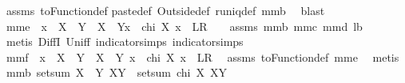 \begin{isabellebody}
\ assms\ toFunction{\isacharunderscore}def\isanewline
paste{\isacharunderscore}def\ Outside{\isacharunderscore}def\ runiq{\isacharunderscore}def\ mm{}{}b\ \isamarkupfalse%
\ blast%
\endisatagproof
{\isafoldproof}%
%
\isadelimproof
%
\endisadelimproof
\isanewline
\isanewline
{}\isamarkupfalse%
\ mm{}{}e{\isacharcolon}\ \ {\isachardoublequoteopen}x\ {\isasymin}\ X\ {\isasymunion}\ Y{\isachardoublequoteclose}\ \ {\isachardoublequoteopen}{\isacharparenleft}X\ {\isacharless}{\isacharbar}{\isacharbar}\ Y{\isacharparenright}{\isacharcomma}{\isacharcomma}x\ {\isacharequal}\ chi\ X\ x{\isachardoublequoteclose}\ {\isacharparenleft}\ {\isachardoublequoteopen}{\isacharquery}L{\isacharequal}{\isacharquery}R{\isachardoublequoteclose}{\isacharparenright}%
\isadelimproof
\ %
\endisadelimproof
%
\isatagproof
{}\isamarkupfalse%
\ \isanewline
assms\ mm{}{}b\ mm{}{}c\ mm{}{}d\ l{}{}b\ \isamarkupfalse%
\ {\isacharparenleft}metis\ DiffI\ Un{\isacharunderscore}iff\ indicator{\isacharunderscore}simps{\isacharparenleft}{}{\isacharparenright}\ indicator{\isacharunderscore}simps{\isacharparenleft}{}{\isacharparenright}{\isacharparenright}%
\endisatagproof
{\isafoldproof}%
%
\isadelimproof
%
\endisadelimproof
\isanewline
\isanewline
{}\isamarkupfalse%
\ mm{}{}f{\isacharcolon}\ \ {\isachardoublequoteopen}x\ {\isasymin}\ X\ {\isasymunion}\ Y{\isachardoublequoteclose}\ \ {\isachardoublequoteopen}{\isacharparenleft}X\ {\isacharless}{\isacharbar}\ Y{\isacharparenright}\ x\ {\isacharequal}\ chi\ X\ x{\isachardoublequoteclose}\ {\isacharparenleft}\ {\isachardoublequoteopen}{\isacharquery}L{\isacharequal}{\isacharquery}R{\isachardoublequoteclose}{\isacharparenright}\ \isanewline
%
\isadelimproof
%
\endisadelimproof
%
\isatagproof
{}\isamarkupfalse%
\ assms\ toFunction{\isacharunderscore}def\ mm{}{}e\ \isamarkupfalse%
\ metis%
\endisatagproof
{\isafoldproof}%
%
\isadelimproof
\isanewline
%
\endisadelimproof
{}\isamarkupfalse%
\ mm{}{}b{\isacharcolon}\ {\isachardoublequoteopen}setsum\ {\isacharparenleft}X\ {\isacharless}{\isacharbar}\ Y{\isacharparenright}\ {\isacharparenleft}X{\isasymunion}Y{\isacharparenright}\ {\isacharequal}\ setsum\ {\isacharparenleft}chi\ X{\isacharparenright}\ {\isacharparenleft}X{\isasymunion}Y{\isacharparenright}{\isachardoublequoteclose}\isanewline

\end{isabellebody}
